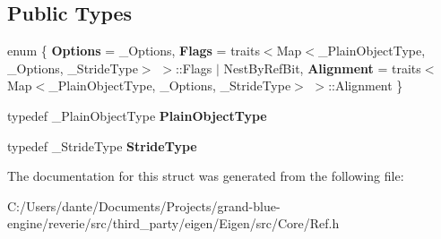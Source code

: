 \subsection*{Public Types}
\begin{DoxyCompactItemize}
\item 
\mbox{\label{struct_eigen_1_1internal_1_1traits_3_01_ref_3_01___plain_object_type_00_01___options_00_01___stride_type_01_4_01_4_a6ca9144e3bf70f85a5d44de9a9d08184}} 
enum \{ {\bfseries Options} = \+\_\+\+Options, 
{\bfseries Flags} = traits$<$Map$<$\+\_\+\+Plain\+Object\+Type, \+\_\+\+Options, \+\_\+\+Stride\+Type$>$ $>$\+::Flags $\vert$ Nest\+By\+Ref\+Bit, 
{\bfseries Alignment} = traits$<$Map$<$\+\_\+\+Plain\+Object\+Type, \+\_\+\+Options, \+\_\+\+Stride\+Type$>$ $>$\+::Alignment
 \}
\item 
\mbox{\label{struct_eigen_1_1internal_1_1traits_3_01_ref_3_01___plain_object_type_00_01___options_00_01___stride_type_01_4_01_4_a1a891225ab7bc2b909fe009cb15af8ca}} 
typedef \+\_\+\+Plain\+Object\+Type {\bfseries Plain\+Object\+Type}
\item 
\mbox{\label{struct_eigen_1_1internal_1_1traits_3_01_ref_3_01___plain_object_type_00_01___options_00_01___stride_type_01_4_01_4_a3d87abd458a368ce0a3ec13e4c90667a}} 
typedef \+\_\+\+Stride\+Type {\bfseries Stride\+Type}
\end{DoxyCompactItemize}


The documentation for this struct was generated from the following file\+:\begin{DoxyCompactItemize}
\item 
C\+:/\+Users/dante/\+Documents/\+Projects/grand-\/blue-\/engine/reverie/src/third\+\_\+party/eigen/\+Eigen/src/\+Core/Ref.\+h\end{DoxyCompactItemize}
